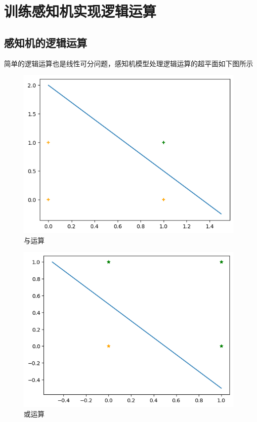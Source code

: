 \chapter{训练感知机实现逻辑运算}

\section{感知机的逻辑运算}

简单的逻辑运算也是线性可分问题，感知机模型处理逻辑运算的超平面如下图所示
\begin{figure}[H]
    \centering
    \includegraphics[scale=0.5]{figures/y_and.png}
    \caption{与运算}
\end{figure}

\begin{figure}[H]
    \centering
    \includegraphics[scale=0.5]{figures/y_or.png}
    \caption{或运算}
\end{figure}



